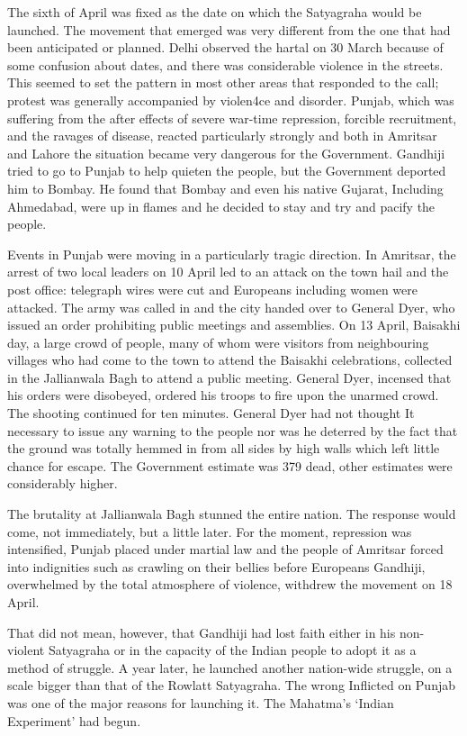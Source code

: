 \begin{multicols}{2}
The sixth of April was fixed as the date on which the Satyagraha would be launched. The movement that emerged was very different from the one that had been anticipated or planned. Delhi observed the hartal on 30 March because of some confusion about dates, and there was considerable violence in the streets. This seemed to set the pattern in most other areas that responded to the call; protest was generally accompanied by violen4ce and disorder. Punjab, which was suffering from the after effects of severe war-time repression, forcible recruitment, and the ravages of disease, reacted particularly strongly and both in Amritsar and Lahore the situation became very dangerous for the Government. Gandhiji tried to go to Punjab to help quieten the people, but the Government deported him to Bombay. He found that Bombay and even his native Gujarat, Including Ahmedabad, were up in flames and he decided to stay and try and pacify the people.

Events in Punjab were moving in a particularly tragic direction. In Amritsar, the arrest of two local leaders on 10 April led to an attack on the town hail and the post office: telegraph wires were cut and Europeans including women were attacked. The army was called in and the city handed over to General Dyer, who issued an order prohibiting public meetings and assemblies. On 13 April, Baisakhi day, a large crowd of people, many of whom were visitors from neighbouring villages who had come to the town to attend the Baisakhi celebrations, collected in the Jallianwala Bagh to attend a public meeting. General Dyer, incensed that his orders were disobeyed, ordered his troops to fire upon the unarmed crowd. The shooting continued for ten minutes. General Dyer had not thought It necessary to issue any warning to the people nor was he deterred by the fact that the ground was totally hemmed in from all sides by high walls which left little chance for escape. The Government estimate was 379 dead, other estimates were considerably higher.

The brutality at Jallianwala Bagh stunned the entire nation. The response would come, not immediately, but a little later. For the moment, repression was intensified, Punjab placed under martial law and the people of Amritsar forced into indignities such as crawling on their bellies before Europeans Gandhiji, overwhelmed by the total atmosphere of violence, withdrew the movement on 18 April.

That did not mean, however, that Gandhiji had lost faith either in his non-violent Satyagraha or in the capacity of the Indian people to adopt it as a method of struggle. A year later, he launched another nation-wide struggle, on a scale bigger than that of the Rowlatt Satyagraha. The wrong Inflicted on Punjab was one of the major reasons for launching it. The Mahatma's `Indian Experiment' had begun.
\end{multicols}